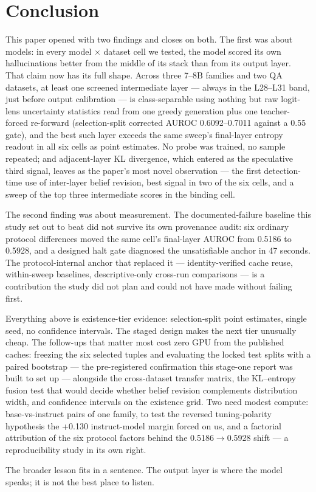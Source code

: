 \section{Conclusion}
\label{sec:conclusion}

This paper opened with two findings and closes on both. The first was about models: in every model $\times$ dataset cell we tested, the model scored its own hallucinations better from the middle of its stack than from its output layer. That claim now has its full shape. Across three 7--8B families and two QA datasets, at least one screened intermediate layer --- always in the L28--L31 band, just before output calibration --- is class-separable using nothing but raw logit-lens uncertainty statistics read from one greedy generation plus one teacher-forced re-forward (selection-split corrected AUROC 0.6092--0.7011 against a 0.55 gate), and the best such layer exceeds the same sweep's final-layer entropy readout in all six cells as point estimates. No probe was trained, no sample repeated; and adjacent-layer KL divergence, which entered as the speculative third signal, leaves as the paper's most novel observation --- the first detection-time use of inter-layer belief revision, best signal in two of the six cells, and a sweep of the top three intermediate scores in the binding cell.

The second finding was about measurement. The documented-failure baseline this study set out to beat did not survive its own provenance audit: six ordinary protocol differences moved the same cell's final-layer AUROC from 0.5186 to 0.5928, and a designed halt gate diagnosed the unsatisfiable anchor in 47 seconds. The protocol-internal anchor that replaced it --- identity-verified cache reuse, within-sweep baselines, descriptive-only cross-run comparisons --- is a contribution the study did not plan and could not have made without failing first.

Everything above is existence-tier evidence: selection-split point estimates, single seed, no confidence intervals. The staged design makes the next tier unusually cheap. The follow-ups that matter most cost zero GPU from the published caches: freezing the six selected tuples and evaluating the locked test splits with a paired bootstrap --- the pre-registered confirmation this stage-one report was built to set up --- alongside the cross-dataset transfer matrix, the KL--entropy fusion test that would decide whether belief revision complements distribution width, and confidence intervals on the existence grid. Two need modest compute: base-vs-instruct pairs of one family, to test the reversed tuning-polarity hypothesis the +0.130 instruct-model margin forced on us, and a factorial attribution of the six protocol factors behind the 0.5186$\rightarrow$0.5928 shift --- a reproducibility study in its own right.

The broader lesson fits in a sentence. The output layer is where the model speaks; it is not the best place to listen.
